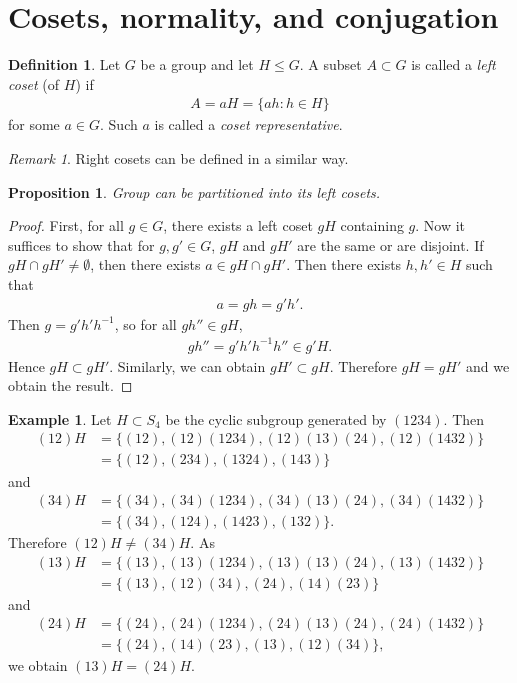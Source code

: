 \documentclass[12pt]{report}
\theoremstyle{plain}
\newtheorem{proposition}[theorem]{Proposition}
\theoremstyle{remark}
\newtheorem*{remark}{Remark}
\theoremstyle{definition}
\newtheorem{definition}[theorem]{Definition}
\newtheorem{example}[theorem]{Example}
\begin{document}
\section{Cosets, normality, and conjugation}
\begin{definition}
    Let $G$ be a group and let $H\le G$. A subset $A\subset G$ is called a \emph{left coset} (of $H$) if
    \begin{align*}
        A=aH=\{ah:h\in H\}
    \end{align*}
    for some $a\in G$. Such $a$ is called a \emph{coset representative}.
\end{definition}
\begin{remark}
    Right cosets can be defined in a similar way.
\end{remark}

\begin{proposition}\label{Proposition 1.4.2.}
    Group can be partitioned into its left cosets.
\end{proposition}
\begin{proof}
    First, for all $g\in G$, there exists a left coset $gH$ containing $g$. Now it suffices to show that for $g,g'\in G$, $gH$ and $gH'$ are the same or are disjoint. If $gH\cap gH'\neq \emptyset$, then there exists $a\in gH\cap gH'$. Then there exists $h,h'\in H$ such that
    \begin{align*}
        a = gh = g'h'.
    \end{align*}
    Then $g = g'h'h^{-1}$, so for all $gh''\in gH$,
    \begin{align*}
        gh'' = g'h'h^{-1}h''\in g'H.
    \end{align*}
    Hence $gH\subset gH'$. Similarly, we can obtain $gH'\subset gH$. Therefore $gH=gH'$ and we obtain the result.
\end{proof}

\begin{example}
    Let $H\subset S_4$ be the cyclic subgroup generated by $(1234)$. Then
    \begin{align*}
        (12)H &= \{(12),(12)(1234),(12)(13)(24),(12)(1432)\} \\
        &= \{(12),(234),(1324),(143)\}
    \end{align*}
    and
    \begin{align*}
        (34)H &= \{(34),(34)(1234),(34)(13)(24),(34)(1432)\} \\
        &= \{(34),(124),(1423),(132)\}.
    \end{align*}
    Therefore $(12)H\neq (34)H$. As
    \begin{align*}
        (13)H &= \{(13),(13)(1234),(13)(13)(24),(13)(1432)\} \\
        &= \{(13),(12)(34),(24),(14)(23)\}
    \end{align*}
    and
    \begin{align*}
        (24)H &= \{(24),(24)(1234),(24)(13)(24),(24)(1432)\} \\
        &= \{(24),(14)(23),(13),(12)(34)\},
    \end{align*}
    we obtain $(13)H=(24)H$.
\end{example}
\end{document}
